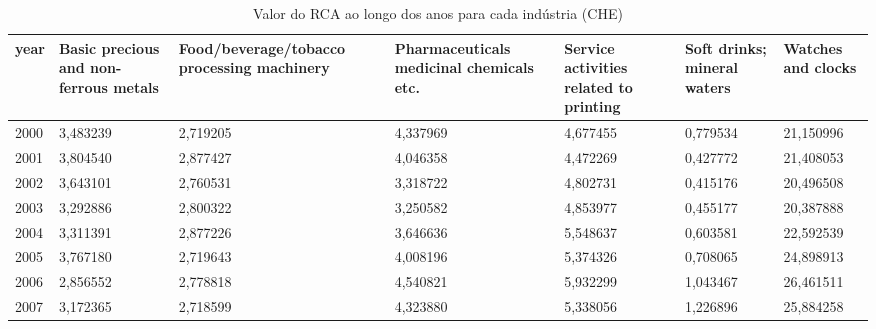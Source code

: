 \begin{table}
\centering
\caption{Valor do RCA ao longo dos anos para cada indústria (CHE)}
\begin{tabular}{p{1cm}p{2cm}p{2cm}p{2cm}p{2cm}p{2cm}p{2cm}}
\toprule
 year &  Basic precious and non-ferrous metals &  Food/beverage/tobacco processing machinery &  Pharmaceuticals medicinal chemicals etc. &  Service activities related to printing &  Soft drinks; mineral waters &  Watches and clocks \\
\midrule
 2000 &                               3,483239 &                                    2,719205 &                                  4,337969 &                                4,677455 &                     0,779534 &           21,150996 \\
 2001 &                               3,804540 &                                    2,877427 &                                  4,046358 &                                4,472269 &                     0,427772 &           21,408053 \\
 2002 &                               3,643101 &                                    2,760531 &                                  3,318722 &                                4,802731 &                     0,415176 &           20,496508 \\
 2003 &                               3,292886 &                                    2,800322 &                                  3,250582 &                                4,853977 &                     0,455177 &           20,387888 \\
 2004 &                               3,311391 &                                    2,877226 &                                  3,646636 &                                5,548637 &                     0,603581 &           22,592539 \\
 2005 &                               3,767180 &                                    2,719643 &                                  4,008196 &                                5,374326 &                     0,708065 &           24,898913 \\
 2006 &                               2,856552 &                                    2,778818 &                                  4,540821 &                                5,932299 &                     1,043467 &           26,461511 \\
 2007 &                               3,172365 &                                    2,718599 &                                  4,323880 &                                5,338056 &                     1,226896 &           25,884258 \\

\end{tabular}
\end{table}
